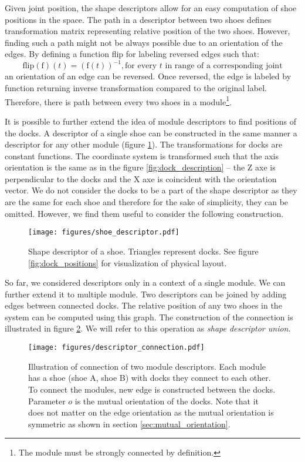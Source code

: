 Given joint position, the shape descriptors allow for an easy computation of
shoe positions in the space. The path in a descriptor between two shoes defines
transformation matrix representing relative position of the two shoes. However,
finding such a path might not be always possible due to an orientation of the
edges. By defining a function flip for labeling reversed edges such that:
\[\text{flip}(\text{f})(t) = (\text{f}(t))^{-1}, \text{for every } t \text{ in
range of a corresponding joint}\] an orientation of an edge can be reversed.
Once reversed, the edge is labeled by function returning inverse transformation
compared to the original label. Therefore, there is path between every two shoes
in a module\footnote{The module must be strongly connected by definition.}.

It is possible to further extend the idea of module descriptors to find
positions of the docks. A descriptor of a single shoe can be constructed in the
same manner a descriptor for any other module (figure
\ref{fig:shoe_descriptor}). The transformations for docks are constant
functions. The coordinate system is transformed such that the axis orientation
is the same as in the figure \ref{fig:dock_description} -- the Z axe is
perpendicular to the docks and the X axe is coincident with the orientation
vector. We do not consider the docks to be a part of the shape descriptor as
they are the same for each shoe and therefore for the sake of simplicity, they
can be omitted. However, we find them useful to consider the following
construction.

\begin{figure}[t]
    \centering
    \texttt{[image: figures/shoe\_descriptor.pdf]}
    \caption{Shape descriptor of a shoe. Triangles represent docks. See figure
    \ref{fig:dock_positions} for visualization of physical layout.}
    \label{fig:shoe_descriptor}
\end{figure}

So far, we considered descriptors only in a context of a single module. We can
further extend it to multiple module. Two descriptors can be joined by adding
edges between connected docks. The relative position of any two shoes in
the system can be computed using this graph. The construction of the connection
is illustrated in figure \ref{fig:connection_descriptor}. We will refer to this
operation as \emph{shape descriptor union}.

\begin{figure}[t]
    \centering
    \texttt{[image: figures/descriptor\_connection.pdf]}
    \caption{Illustration of connection of two module descriptors. Each module
    has a shoe (shoe A, shoe B) with docks they connect to each other. To
    connect the modules, new edge is constructed between the docks. Parameter
    $o$ is the mutual orientation of the docks. Note that it does not matter on
    the edge orientation as the mutual orientation is symmetric as shown in
    section \ref{sec:mutual_orientation}. }
    \label{fig:connection_descriptor}
\end{figure}


